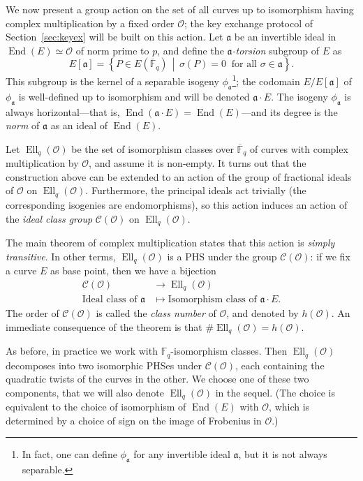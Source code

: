 \documentclass{llncs}
\newcommand{\F}{\mathbb{F}}
\newcommand{\Fbar}{\overline{\mathbb{F}}}
\newcommand{\Cl}{\mathcal{C}}
\renewcommand{\O}{\mathcal{O}}
\newcommand{\set}[1]{\left\{#1\right\}}
\newcommand{\suchthat}{\,\middle\vert\,}
\renewcommand{\frak}{\mathfrak}
\DeclareMathOperator{\End}{End}
\DeclareMathOperator{\Ell}{Ell}
\begin{document}
We now present a group action on the set of all curves 
up to isomorphism having complex
multiplication by a fixed order $\O$; the key exchange protocol of
Section~\ref{sec:keyex} will be built on this action. Let $\frak a$ be
an invertible ideal in $\End(E)≃\O$ of norm prime to $p$, and define the
\emph{${\frak a}$-torsion} subgroup of $E$ as
\[
E[\frak a] = \set{P\in E(\Fbar_q) \suchthat σ(P) = 0\ 
\text{ for all }σ\in\frak a}.
\]
This subgroup is the kernel of a separable isogeny $\phi_{\frak a}$\footnote{In fact, one can define $\phi_{\frak a}$ for any invertible ideal $\frak a$, but it is not always separable.};
the codomain $E/E[\frak a]$ of $\phi_{\frak a}$ is well-defined up to isomorphism
and will be denoted $\frak a\cdot E$.
The isogeny $\phi_{\frak a}$ is
always horizontal---that is, $\End(\frak a \cdot E) = \End(E)$---and its
degree is the \emph{norm} of $\frak a$ as an ideal of $\End(E)$.

Let $\Ell_q(\O)$ be the set of isomorphism classes over $\Fbar_q$
of curves with complex multiplication by $\O$, and assume it is non-empty. 
It turns out that the construction above can be extended
to an action of the group of fractional ideals of $\O$ on $\Ell_q(\O)$.
Furthermore, the principal ideals act trivially 
(the corresponding isogenies are endomorphisms), 
so this action induces an action of the \emph{ideal
class group} $\Cl(\O)$ on $\Ell_q(\O)$.

The main theorem of complex
multiplication states that this action is \emph{simply transitive}. In
other terms, $\Ell_q(\O)$ is a PHS
under the group $\Cl(\O)$: if we fix a curve $E$ as base point,
then we have a bijection
\[
\begin{aligned}
\Cl(\O) &\longrightarrow \Ell_q(\O) \\
\text{Ideal class of }\frak a &\longmapsto \text{Isomorphism class of }\frak a\cdot E.
\end{aligned}
\]
The order of $\Cl(\O)$ is called the \emph{class number} of $\O$, and
denoted by $h(\O)$. An immediate consequence of the theorem is that
$\#\Ell_q(\O)=h(\O)$.

As before, in practice we work with $\F_q$-isomorphism classes.
Then $\Ell_q(\O)$ decomposes into two isomorphic PHSes under $\Cl(\O)$,
each containing the quadratic twists of the curves in the other. 
We choose one of these
two components, that we will also denote $\Ell_q(\O)$ in the sequel.
(The choice is equivalent to the choice of isomorphism of $\End(E)$ with
$\O$, which is determined by a choice of sign on the image of Frobenius
in $\O$.)
\end{document}
